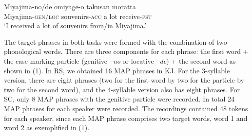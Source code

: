 \documentclass[output=paper]{LSP/langsci}
\begin{document}
\begin{table} 
\caption{Target words in two tasks (RS and SC) and their tones in SJ and KJ.}
\label{tab:ota:3}
\end{table}

\ea
\label{ex:ota:1}
\gll Miyajima-no/de     omiyage-o    takusan   moratta\\
{Miyajima\textsc{{}-gen/loc}}  {souvenirs-\textsc{acc}}   {a lot}  {receive-\textsc{pst}}\\ 
\glt `I received a lot of souvenirs from/in Miyajima.'
\z

The target phrases in both tasks were formed with the combination of two phonological words. There are three components for each phrase: the first word + the case marking particle (genitive \textit{–no} or locative \textit{–de}) + the second word as shown in (1). In RS, we obtained 16 MAP phrases in KJ. For the 3-syllable version, there are eight phrases (two for the first word by two for the particle by two for the second word), and the 4-syllable version also has eight phrases.  For SC, only 8 MAP phrases with the genitive particle were recorded. In total 24 MAP phrases for each speaker were recorded. The recordings contained 48 tokens for each speaker, since each MAP phrase comprises two target words, word 1 and word 2 as exemplified in (1).
\end{document}
